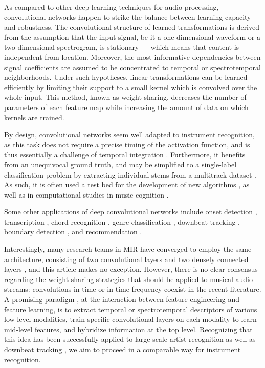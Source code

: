 \documentclass{article}
\begin{document}
As compared to other deep learning techniques for audio processing,
convolutional networks happen to strike the balance between
learning capacity and robustness.
The convolutional structure of learned transformations is derived from
the assumption that the input signal, be it a one-dimensional waveform
or a two-dimensional spectrogram, is stationary --- which means that
content is independent from location.
Moreover, the most informative dependencies between signal coefficients
are assumed to be concentrated to temporal or spectrotemporal neighborhoods.
Under such hypotheses, linear transformations can be learned efficiently
by limiting their support to a small kernel which is convolved over
the whole input.
This method, known as weight sharing, decreases the number of parameters
of each feature map while increasing the amount of data on which kernels are
trained.

By design, convolutional networks seem well adapted to instrument
recognition, as this task does not require a precise timing of the activation function,
and is thus essentially a challenge of temporal integration \cite{Eronen2000, Joder2009}.
Furthermore, it benefits from an unequivocal ground truth, and may be simplified
to a single-label classification problem by extracting individual stems from a
multitrack dataset \cite{Bittner2014}.
As such, it is often used a test bed for the development of new algorithms
\cite{McFee2015-muda, Li2015},
as well as in computational studies in music cognition \cite{Newton2012, Patil2012}.

Some other applications of deep convolutional networks include onset
detection \cite{Schluter2014}, transcription \cite{Sigtia2015},
chord recognition \cite{Humphrey2012tonnetz},
genre classification \cite{Choi2015},
downbeat tracking \cite{Durand2016},
boundary detection \cite{Ullrich2014}, and
recommendation \cite{vandenOord2013}.

Interestingly, many research teams in MIR have converged to employ the same
architecture, consisting of two convolutional layers and two densely connected layers
\cite{Dieleman2014, Humphrey2012tonnetz,
Kereliuk2015, Li2015, McFee2015-muda, Schluter2014, Ullrich2014}, and this
article makes no exception.
However, there is no clear consensus regarding the
weight sharing strategies that should be applied to musical audio streams:
convolutions in time or in time-frequency coexist in the recent literature.
A promising paradigm \cite{Dieleman2011, Durand2016}, at the interaction
between feature engineering and feature learning, is to extract
temporal or spectrotemporal descriptors of various low-level modalities,
train specific convolutional layers on each modality
to learn mid-level features, and hybridize information at the top level.
Recognizing that this idea has been successfully applied to large-scale artist
recognition \cite{Dieleman2011} as well as downbeat tracking
\cite{Durand2016}, we aim to proceed in a comparable way for instrument
recognition.
\end{document}
